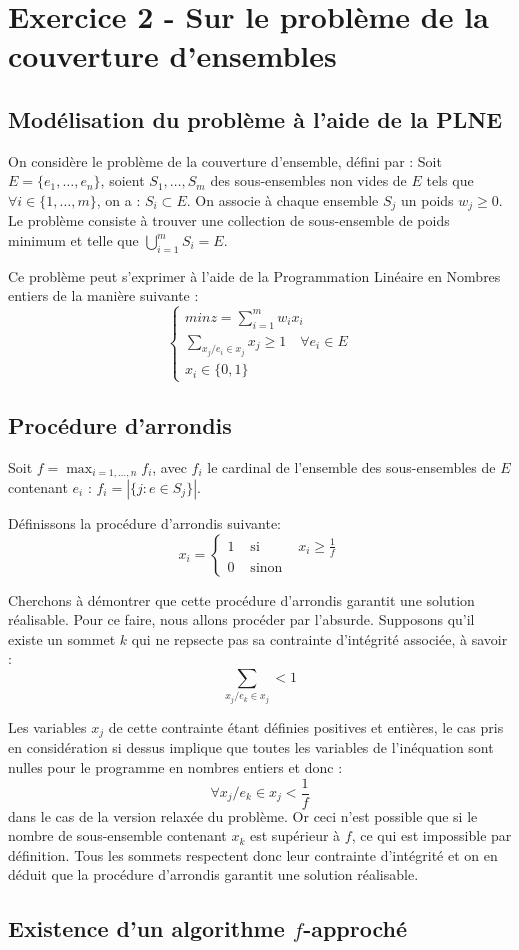\section{Exercice 2 - Sur le problème de la couverture d'ensembles}

\subsection{Modélisation du problème à l'aide de la PLNE}

On considère le problème de la couverture d'ensemble, défini par :
Soit $E = \lbrace e_1, \dots, e_n \rbrace$, soient $S_1, \dots, S_m$ des sous-ensembles non vides
de $E$ tels que $\forall i \in \{1, \dots, m\}$, on a : $S_i \subset E$. On associe à chaque
ensemble $S_j$ un poids $w_j \geq 0$. Le problème consiste à trouver une collection de sous-ensemble
de poids minimum et telle que $\bigcup_{i=1}^m S_i = E$.

Ce problème peut s'exprimer à l'aide de la Programmation Linéaire en Nombres entiers de la manière
suivante : $$
\left \lbrace
\begin{array}{l}
	min z = \sum_{i=1}^m w_ix_i \\
	\sum_{x_j / e_i \in x_j} x_j \geq 1 \quad \forall e_i \in E \\
	x_i \in \{0, 1\}
\end{array} \right.
$$

\subsection{Procédure d'arrondis}

Soit $f = \max_{i=1,\dots,n} f_i$, avec $f_i$ le cardinal de l'ensemble des sous-ensembles de $E$
contenant $e_i$ : $ f_i = |\{j : e \in S_j\}|$.

Définissons la procédure d'arrondis suivante: $$
x_i = \left \{ \begin{array}{rcl}
		1 & \mbox{ si } & x_i \geq \frac{1}{f} \\
		0 & \mbox{ sinon } &
	\end{array} \right .
	$$

Cherchons à démontrer que cette procédure d'arrondis garantit une solution réalisable. Pour ce
faire, nous allons procéder par l'absurde. Supposons qu'il existe un sommet $k$ qui ne repsecte pas
sa contrainte d'intégrité associée, à savoir : $$
\sum_{x_j / e_k \in x_j} < 1 $$

Les variables $x_j$ de cette contrainte étant définies positives et entières, le cas pris en
considération si dessus implique que toutes les variables de l'inéquation sont nulles pour le
programme en nombres entiers et donc : $$
\forall x_j / e_k \in x_j < \frac{1}{f} $$ dans le cas de la version relaxée du problème. Or ceci
n'est possible que si le nombre de sous-ensemble contenant $x_k$ est supérieur à $f$, ce qui est
impossible par définition. Tous les sommets respectent donc leur contrainte d'intégrité et on en
déduit que la procédure d'arrondis garantit une solution réalisable.

\subsection{Existence d'un algorithme $f$-approché}




	
